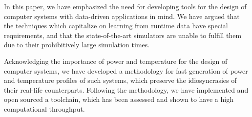 In this paper, we have emphasized the need for developing tools for the design
of computer systems with data-driven applications in mind. We have argued that
the techniques which capitalize on learning from runtime data have special
requirements, and that the state-of-the-art simulators are unable to fulfill
them due to their prohibitively large simulation times.

Acknowledging the importance of power and temperature for the design of computer
systems, we have developed a methodology for fast generation of power and
temperature profiles of such systems, which preserve the idiosyncrasies of their
real-life counterparts. Following the methodology, we have implemented and
open sourced a toolchain, which has been assessed and shown to have a high
computational throughput.
